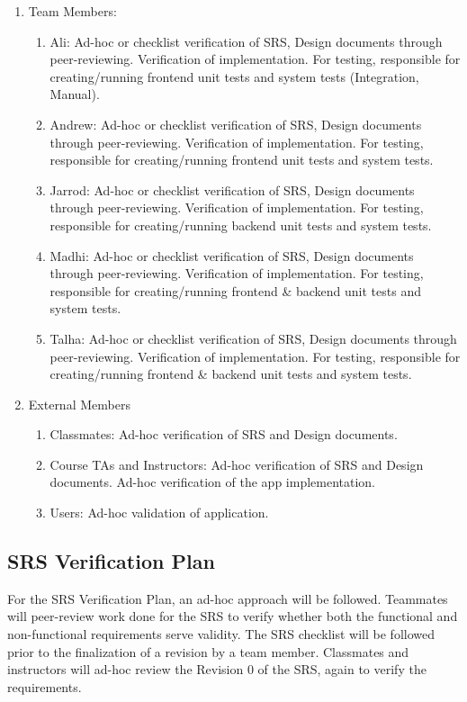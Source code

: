\documentclass[12pt, titlepage]{article}
\begin{document}
\begin{enumerate}
	\item Team Members:
	\begin{enumerate}
		\item Ali: Ad-hoc or checklist verification of SRS, Design documents through peer-reviewing. Verification of implementation. For testing, responsible for creating/running frontend unit tests and system tests (Integration, Manual).
		\item Andrew: Ad-hoc or checklist verification of SRS, Design documents through peer-reviewing. Verification of implementation. For testing, responsible for creating/running frontend unit tests and system tests.
		\item Jarrod: Ad-hoc or checklist verification of SRS, Design documents through peer-reviewing. Verification of implementation. For testing, responsible for creating/running backend unit tests and system tests.
		\item Madhi: Ad-hoc or checklist verification of SRS, Design documents through peer-reviewing. Verification of implementation. For testing, responsible for creating/running frontend \& backend unit tests and system tests.
		\item Talha: Ad-hoc or checklist verification of SRS, Design documents through peer-reviewing. Verification of implementation. For testing, responsible for creating/running frontend \& backend unit tests and system tests.
	\end{enumerate}
	\item External Members
	\begin{enumerate}
		\item Classmates: Ad-hoc verification of SRS and Design documents.
		\item Course TAs and Instructors: Ad-hoc verification of SRS and Design documents. Ad-hoc verification of the app implementation.
		\item Users: Ad-hoc validation of application.
	\end{enumerate}
\end{enumerate}


\subsection{SRS Verification Plan}
For the SRS Verification Plan, an ad-hoc approach will be followed. Teammates will peer-review work done for the SRS to verify whether both the functional and non-functional requirements serve validity. The SRS checklist will be followed prior to the finalization of a revision by a team member. Classmates and instructors will ad-hoc review the Revision 0 of the SRS, again to verify the requirements.
\end{document}
